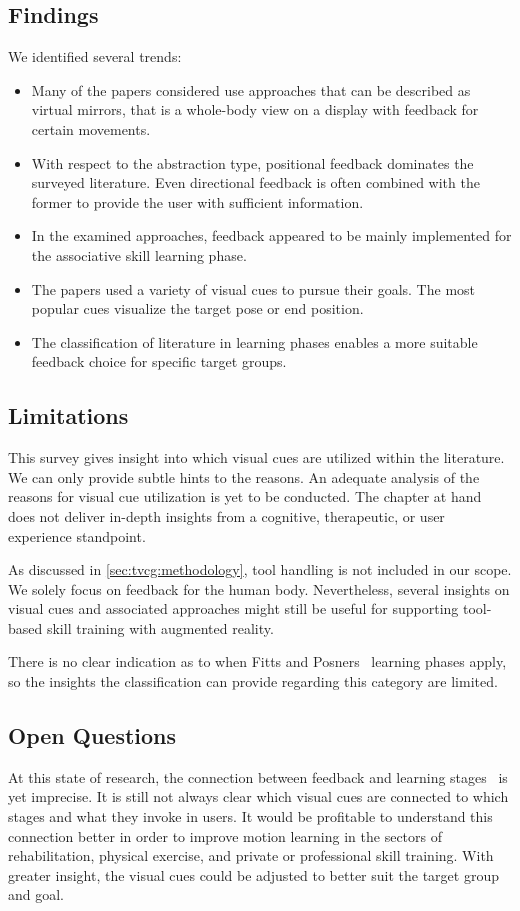 \subsection{Findings}
We identified several trends:
\begin{itemize}
    \setlength{\itemsep}{-0.3cm}
    \item Many of the papers considered use approaches that can be described as virtual mirrors, that is a whole-body view on a display with feedback for certain movements.
    \item With respect to the abstraction type, positional feedback dominates the surveyed literature. Even directional feedback is often combined with the former to provide the user with sufficient information.
    \item In the examined approaches, feedback appeared to be mainly implemented for the associative skill learning phase.
    \item The papers used a variety of visual cues to pursue their goals. The most popular cues visualize the target pose or end position.
    \item The classification of literature in learning phases enables a more suitable feedback choice for specific target groups.
\end{itemize}

\subsection{Limitations}
This survey gives insight into which visual cues are utilized within the literature. We can only provide subtle hints to the reasons. An adequate analysis of the reasons for visual cue utilization is yet to be conducted. The chapter at hand does not deliver in-depth insights from a cognitive, therapeutic, or user experience standpoint.

As discussed in \autoref{sec:tvcg:methodology}, tool handling is not included in our scope. We solely focus on feedback for the human body. Nevertheless, several insights on visual cues and associated approaches might still be useful for supporting tool-based skill training with augmented reality.

There is no clear indication as to when Fitts and Posners~\cite{fitts1967HPe} learning phases apply, so the insights the classification can provide regarding this category are limited.

\subsection{Open Questions \label{sec:futureWork}}
At this state of research, the connection between feedback and learning stages~\cite{fitts1967HPe} is yet imprecise. It is still not always clear which visual cues are connected to which stages and what they invoke in users. It would be profitable to understand this connection better in order to improve motion learning in the sectors of rehabilitation, physical exercise, and private or professional skill training. With greater insight, the visual cues could be adjusted to better suit the target group and goal.

